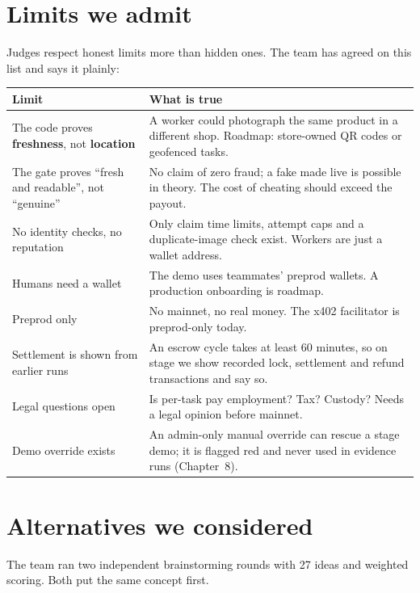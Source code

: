 \section{Limits we admit}
Judges respect honest limits more than hidden ones. The team has agreed on this list and says it plainly:

\begin{center}
\small
\begin{tabularx}{\textwidth}{@{}p{4.2cm}X@{}}
\toprule
\textbf{Limit} & \textbf{What is true}\\
\midrule
The code proves \textbf{freshness}, not \textbf{location} & A worker could photograph the same product in a different shop. Roadmap: store-owned QR codes or geofenced tasks.\\
The gate proves ``fresh and readable'', not ``genuine'' & No claim of zero fraud; a fake made live is possible in theory. The cost of cheating should exceed the payout.\\
No identity checks, no reputation & Only claim time limits, attempt caps and a duplicate-image check exist. Workers are just a wallet address.\\
Humans need a wallet & The demo uses teammates' preprod wallets. A production onboarding is roadmap.\\
Preprod only & No mainnet, no real money. The x402 facilitator is preprod-only today.\\
Settlement is shown from earlier runs & An escrow cycle takes at least 60 minutes, so on stage we show recorded lock, settlement and refund transactions and say so.\\
Legal questions open & Is per-task pay employment? Tax? Custody? Needs a legal opinion before mainnet.\\
Demo override exists & An admin-only manual override can rescue a stage demo; it is flagged red and never used in evidence runs (Chapter~8).\\
\bottomrule
\end{tabularx}
\end{center}

\section{Alternatives we considered}
The team ran two independent brainstorming rounds with 27 ideas and weighted scoring. Both put the same concept first.

